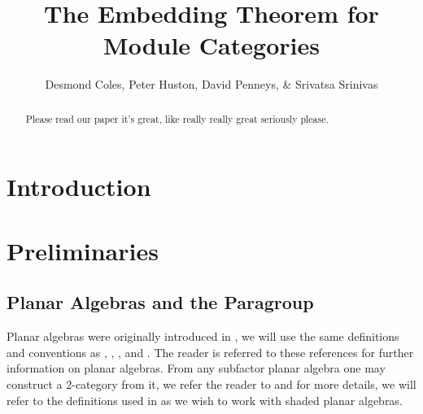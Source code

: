 \documentclass[11pt]{article}
\title{The Embedding Theorem for Module Categories}
\author{Desmond Coles, Peter Huston, David Penneys, \& Srivatsa Srinivas}
\theoremstyle{plain}
\theoremstyle{definition}
\begin{document}

\maketitle
\begin{abstract}
Please read our paper it's great, like really really great seriously please.
\end{abstract}
\section{Introduction}
\section{Preliminaries}
\subsection{Planar Algebras and the Paragroup}
Planar algebras were originally introduced in \cite{planaralg1}, we will use the same definitions and conventions as \cite{penneys}, \cite{peters}, \cite{jones}, and \cite{planaralg2}. The reader is referred to these references for further information on planar algebras. From any subfactor planar algebra one may construct a 2-category from it, we refer the reader to \cite{paragroup} and \cite{paragroup2} for more details, we will refer to the definitions used in \cite{paragroup} as we wish to work with shaded planar algebras.
\end{document}

